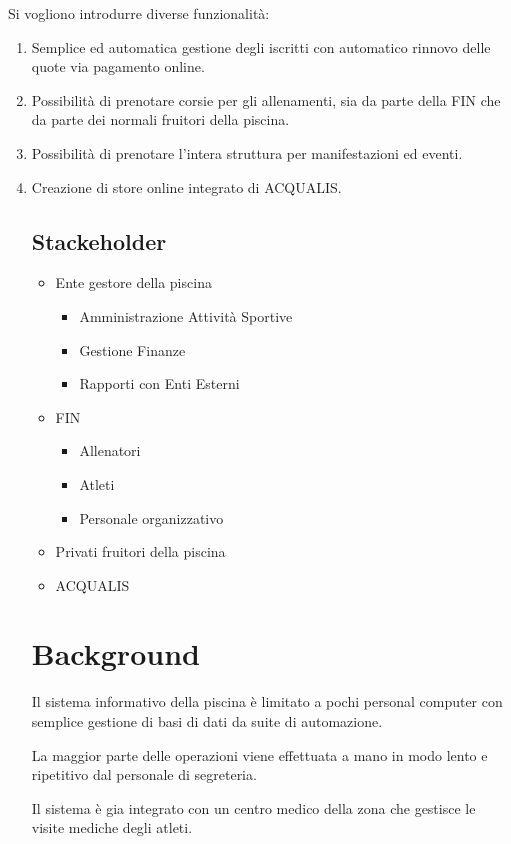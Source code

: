 \documentclass[11pt]{article} %
\begin{document}
Si vogliono introdurre diverse funzionalità:
\begin{enumerate}
	\item Semplice ed automatica gestione degli iscritti con automatico rinnovo delle quote via pagamento online. 
	\item Possibilità di prenotare corsie per gli allenamenti, sia da parte della FIN che da parte dei normali fruitori della piscina.
	\item Possibilità di prenotare l'intera struttura per manifestazioni ed eventi.
	\item Creazione di store online integrato di ACQUALIS.
\subsection*{Stackeholder}

\begin{itemize}
	\item Ente gestore della piscina
	\begin{itemize}
		\item Amministrazione Attività Sportive
		\item Gestione Finanze
		\item Rapporti con Enti Esterni
	\end{itemize}
	\item FIN
	\begin{itemize}
		\item Allenatori
		\item Atleti
		\item Personale organizzativo
	\end{itemize}
	\item Privati fruitori della piscina
	\item ACQUALIS
\end{itemize}


\section{Background}

Il sistema informativo della piscina è limitato a pochi personal computer con semplice gestione di basi di dati da suite di automazione.

La maggior parte delle operazioni viene effettuata a mano in modo lento e ripetitivo dal personale di segreteria.


Il sistema è gia integrato con un centro medico della zona che gestisce le visite mediche degli atleti.


\end{enumerate}
\end{document}

